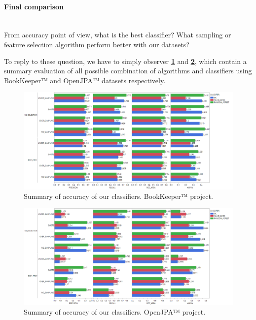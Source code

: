 \documentclass[sigconf]{acmart}
\begin{document}
\paragraph{Final comparison} 
\hfill\\
From accuracy point of view, what is the best classifier? What sampling or feature selection algorithm perform better with our datasets?

To reply to these question, we have to simply observer \textbf{\cref{BOOKKEEPER-Total}} and \textbf{\cref{OPENJPA-Total}}, which contain a summary evaluation of all possible combination of algorithms and classifiers using BookKeeper™ and OpenJPA™ datasets respectively.

\begin{figure}[h!]
  \centering
  \includegraphics[width=\textwidth]{./BOOKKEEPER/Total.png}
  \caption{Summary of accuracy of our classifiers. \newline BookKeeper™ project. \newline}
  \label{BOOKKEEPER-Total}
\end{figure}

\begin{figure}[h!]
  \centering
  \includegraphics[width=\textwidth]{./OPENJPA/Total.png}
  \caption{Summary of accuracy of our classifiers. \newline OpenJPA™ project. \newline\newline\newline\newline\newline}
  \label{OPENJPA-Total}
\end{figure}
\end{document}
